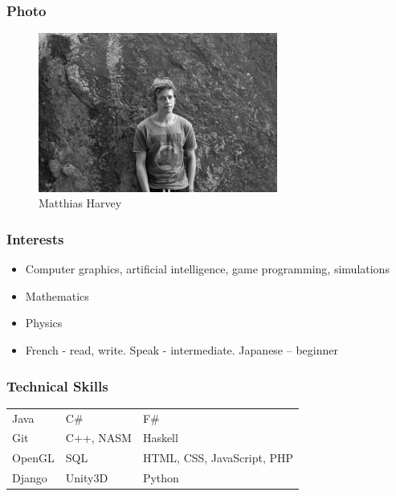 \documentclass{article}
\begin{document}
\subsubsection{Photo}
\begin{figure}[H]
	\centering
	\includegraphics[width=0.7\textwidth]{../matthias.jpg}
	\caption{Matthias Harvey}
\end{figure}
\subsubsection{Interests}
\begin{itemize}
	\item Computer graphics, artificial intelligence, game programming, simulations
	\item Mathematics
	\item Physics
	\item French - read, write. Speak - intermediate. Japanese – beginner
\end{itemize}
\subsubsection{Technical Skills}

\begin{tabular}{| l | l | l |}
	Java   & C\#     & F\#                          \\
	Git    & C++, NASM     & Haskell                     \\
	OpenGL & SQL     & HTML, CSS, JavaScript, PHP   \\
	Django & Unity3D & Python                     
\end{tabular}
\end{document}
